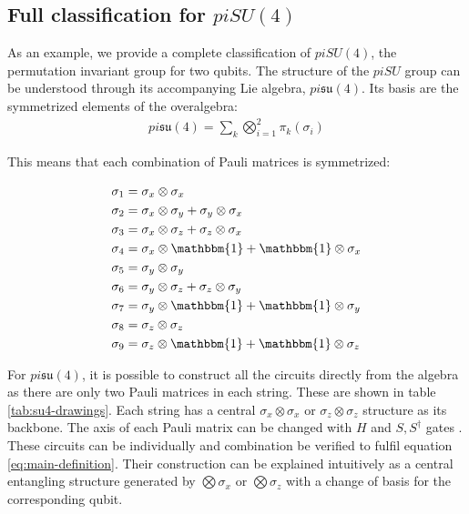 \documentclass[%
 reprint,
 amsmath,amssymb,
 aps,
]{revtex4-2}
\theoremstyle{definition}%
\begin{document}
\subsection{Full classification for $piSU(4)$}\label{ssec:pisu4}

As an example, we provide a complete classification of $piSU(4)$, the permutation invariant group for two qubits. The structure of the $piSU$ group can be understood through its accompanying Lie algebra, $pi\mathfrak{su}(4)$. Its basis are the symmetrized elements of the overalgebra:
\begin{align}
    pi\mathfrak{su}(4) = \sum_k \bigotimes^2_{i=1} \pi_k(\sigma_i)
\end{align}

This means that each combination of Pauli matrices is symmetrized:

\begin{align*}
    \sigma_1 &= \sigma_x \otimes \sigma_x\\
    \sigma_2 &= \sigma_x \otimes \sigma_y + \sigma_y \otimes \sigma_x\\
    \sigma_3 &= \sigma_x \otimes \sigma_z + \sigma_z \otimes \sigma_x\\
    \sigma_4 &= \sigma_x \otimes \mathbbm{1} + \mathbbm{1} \otimes \sigma_x\\
    \sigma_5 &= \sigma_y \otimes \sigma_y\\
    \sigma_6 &= \sigma_y \otimes \sigma_z + \sigma_z \otimes \sigma_y\\
    \sigma_7 &= \sigma_y \otimes \mathbbm{1} + \mathbbm{1} \otimes \sigma_y\\
    \sigma_8 &= \sigma_z \otimes \sigma_z\\
    \sigma_9 &= \sigma_z \otimes \mathbbm{1} + \mathbbm{1} \otimes \sigma_z
\end{align*}

For $pi\mathfrak{su}(4)$, it is possible to construct all the circuits directly from the algebra as there are only two Pauli matrices in each string. These are shown in table \ref{tab:su4-drawings}. Each string has a central $\sigma_x \otimes \sigma_x$ or $\sigma_z \otimes \sigma_z$ structure as its backbone. The axis of each Pauli matrix can be changed with $H$ and $S, S^\dagger$ gates \cite{nielsen_quantum_2010}.  These circuits can be individually and combination be verified to fulfil equation \eqref{eq:main-definition}. Their construction can be explained intuitively as a central entangling structure generated by $\bigotimes \sigma_x$ or $\bigotimes \sigma_z$ with a change of basis for the corresponding qubit.
\end{document}
